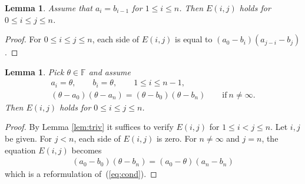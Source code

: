 \documentclass[pdftex]{sigma}
\numberwithin{equation}{section}
\newtheorem{Lemma}[Theorem]{Lemma}
\begin{document}
\begin{Lemma}Assume that
$a_i = b_{i-1}$ for $1 \leq i \leq n$. Then
$E(i,j)$ holds for $0 \leq i\leq j \leq n$.
\end{Lemma}
\begin{proof} For
$0 \leq i\leq j \leq n$,
each side of
$E(i,j)$ is equal to
$(a_0-b_i)(a_{j-i}-b_j)$.
\end{proof}
\begin{Lemma}
Pick $\theta \in \mathbb F$ and assume
\begin{gather}
a_i = \theta,\qquad b_i = \theta, \qquad 1 \leq i \leq n-1,\nonumber\\
(\theta-a_0)(\theta-a_{n})=(\theta-b_0)(\theta-b_{n})
 \qquad \text{if} \ n\not=\infty.\label{eq:cond}
\end{gather}
Then $E(i,j)$ holds for $0 \leq i\leq j \leq n$.
\end{Lemma}
\begin{proof}By Lemma \ref{lem:triv} it suffices to verify
$E(i,j)$ for $1\leq i< j\leq n$.
Let $i,j$ be given. For $j<n$, each side of $E(i,j)$ is zero.
For
$n\not=\infty $ and $j=n$, the equation $E(i,j)$ becomes
\begin{gather*}
(a_0-b_0)(\theta-b_n)= (a_0-\theta)(a_n-b_n)
\end{gather*}
which is a reformulation of~(\ref{eq:cond}).
\end{proof}
\end{document}
